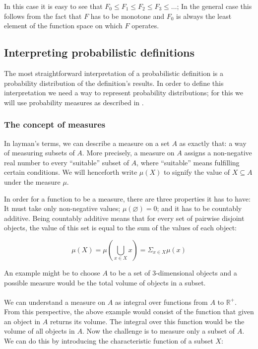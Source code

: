 \documentclass[11pt, leqno, titlepage]{article}
\theoremstyle{definition}
\begin{document}
In this case it is easy to see that $F_0 \leq F_1 \leq F_2 \leq F_3 \leq \dots$; In
the general case this follows from the fact that $F$ has to be monotone and $F_0$ is
always the least element of the function space on which $F$ operates.


\subsection{Interpreting probabilistic definitions}\label{sec:prob-interp}
The most straightforward interpretation of a probabilistic definition is a
probability distribution of the definition's results. In order to define this
interpretation we need a way to represent probability distributions; for this we will
use probability measures as described in \cite{rml-paper}.

\subsubsection{The concept of measures}
In layman's terms, we can describe a measure on a set $A$ as exactly that: a way of
measuring subsets of $A$. More precisely, a measure on $A$ assigns a non-negative
real number to every ``suitable'' subset of $A$, where ``suitable'' means fulfilling
certain conditions. We will henceforth write $\mu (X)$ to signify the value of $X
\subseteq A$ under the measure $\mu$.

In order for a function to be a measure, there are three properties it has to have:
It must take only non-negative values; $\mu (\varnothing) = 0$; and it has to be
countably additive. Being countably additive means that for every set of pairwise
disjoint objects, the value of this set is equal to the sum of the values of each
object:

\begin{equation*}
  \mu (X) = \mu(\bigcup_{x\in X} x) = \Sigma_{x\in X} \mu (x)
\end{equation*}

An example might be to choose $A$ to be a set of 3-dimensional objects and a possible
measure would be the total volume of objects in a subset. \\
\\
We can understand a measure on $A$ as integral
over functions from $A$ to $\mathbb{R}^+$. From this perspective, the above example
would consist of the function that given an object in $A$ returns its volume. The
integral over this function would be the volume of all objects in $A$. Now the
challenge is to measure only a subset of $A$. We can do this by introducing the
characteristic function of a subset $X$\cite{wiki-measure}:
\end{document}
